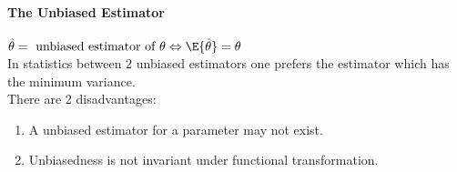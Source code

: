 \paragraph{The Unbiased Estimator}
$\hat{\theta} =\text{ unbiased estimator of }\theta \Leftrightarrow
\E{\hat{\theta}}=\theta$\\
In statistics between 2 unbiased estimators one prefers the estimator
which has the minimum variance. \\
There are 2 disadvantages:
\begin{enumerate}
	\item A unbiased estimator for a parameter may not exist.
	\item Unbiasedness is not invariant under functional 
		transformation.
\end{enumerate}
